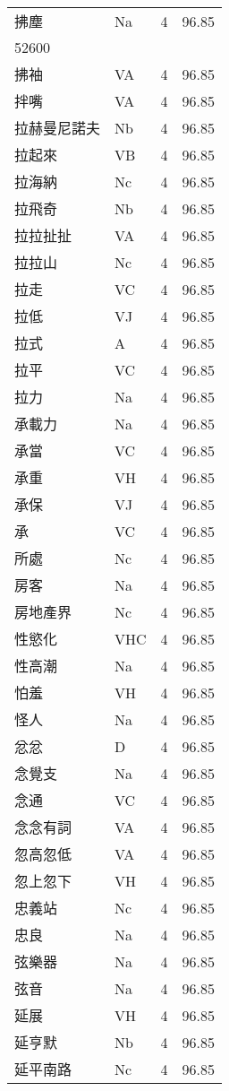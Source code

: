 \documentclass[twocolumn]{book}
\begin{document}
\begin{supertabular}{llrr}
拂塵 & Na & 4 &  96.85\\
52600\\
拂袖 & VA & 4 &  96.85\\
拌嘴 & VA & 4 &  96.85\\
拉赫曼尼諾夫 & Nb & 4 &  96.85\\
拉起來 & VB & 4 &  96.85\\
拉海納 & Nc & 4 &  96.85\\
拉飛奇 & Nb & 4 &  96.85\\
拉拉扯扯 & VA & 4 &  96.85\\
拉拉山 & Nc & 4 &  96.85\\
拉走 & VC & 4 &  96.85\\
拉低 & VJ & 4 &  96.85\\
拉式 & A & 4 &  96.85\\
拉平 & VC & 4 &  96.85\\
拉力 & Na & 4 &  96.85\\
承載力 & Na & 4 &  96.85\\
承當 & VC & 4 &  96.85\\
承重 & VH & 4 &  96.85\\
承保 & VJ & 4 &  96.85\\
承 & VC & 4 &  96.85\\
所處 & Nc & 4 &  96.85\\
房客 & Na & 4 &  96.85\\
房地產界 & Nc & 4 &  96.85\\
性慾化 & VHC & 4 &  96.85\\
性高潮 & Na & 4 &  96.85\\
怕羞 & VH & 4 &  96.85\\
怪人 & Na & 4 &  96.85\\
忿忿 & D & 4 &  96.85\\
念覺支 & Na & 4 &  96.85\\
念通 & VC & 4 &  96.85\\
念念有詞 & VA & 4 &  96.85\\
忽高忽低 & VA & 4 &  96.85\\
忽上忽下 & VH & 4 &  96.85\\
忠義站 & Nc & 4 &  96.85\\
忠良 & Na & 4 &  96.85\\
弦樂器 & Na & 4 &  96.85\\
弦音 & Na & 4 &  96.85\\
延展 & VH & 4 &  96.85\\
延亨默 & Nb & 4 &  96.85\\
延平南路 & Nc & 4 &  96.85\\

\end{supertabular}
\end{document}
